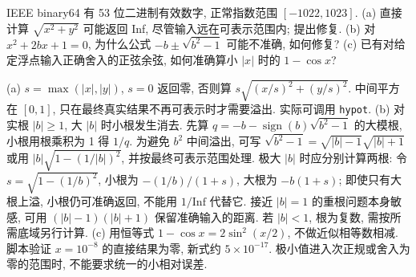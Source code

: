 \begin{exercise}\label{e2011:q4}
IEEE binary64 有 53 位二进制有效数字, 正常指数范围 $[-1022,1023]$.
(a) 直接计算 $\sqrt{x^2+y^2}$ 可能返回 Inf, 尽管输入远在可表示范围内; 提出修复.
(b) 对 $x^2+2bx+1=0$, 为什么公式 $-b\pm\sqrt{b^2-1}$ 可能不准确, 如何修复?
(c) 已有对给定浮点输入正确舍入的正弦余弦, 如何准确算小 $|x|$ 时的 $1-\cos x$?
\end{exercise}
\begin{solution}
(a) $s=\max(|x|,|y|)$, $s=0$ 返回零, 否则算 $s\sqrt{(x/s)^2+(y/s)^2}$. 中间平方在 $[0,1]$, 只在最终真实结果不再可表示时才需要溢出. 实际可调用 \texttt{hypot}.
(b) 对实根 $|b|\ge1$, 大 $|b|$ 时小根发生消去. 先算 $q=-b-\operatorname{sign}(b)\sqrt{b^2-1}$ 的大模根, 小根用根乘积为 1 得 $1/q$. 为避免 $b^2$ 中间溢出, 可写 $\sqrt{b^2-1}=\sqrt{|b|-1}\sqrt{|b|+1}$ 或用 $|b|\sqrt{1-(1/|b|)^2}$, 并按最终可表示范围处理. 极大 $|b|$ 时应分别计算两根: 令 $s=\sqrt{1-(1/b)^2}$, 小根为 $-(1/b)/(1+s)$, 大根为 $-b(1+s)$; 即使只有大根上溢, 小根仍可准确返回, 不能用 $1/\mathrm{Inf}$ 代替它. 接近 $|b|=1$ 的重根问题本身敏感, 可用 $(|b|-1)(|b|+1)$ 保留准确输入的距离. 若 $|b|<1$, 根为复数, 需按所需底域另行计算.
(c) 用恒等式 $1-\cos x=2\sin^2(x/2)$, 不做近似相等数相减. 脚本验证 $x=10^{-8}$ 的直接结果为零, 新式约 $5\times10^{-17}$. 极小值进入次正规或舍入为零的范围时, 不能要求统一的小相对误差.
\end{solution}
